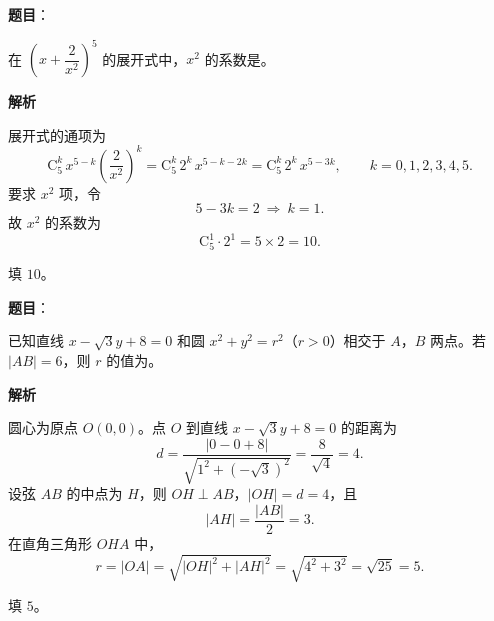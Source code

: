 \begin{answer}

\textbf{题目}：

在 $\left(x+\dfrac{2}{x^2}\right)^5$ 的展开式中，$x^2$ 的系数是\gkblank{}。

\textbf{解析}

展开式的通项为
\nopagebreak[4]
\[\mathrm C_5^k\,x^{5-k}\left(\frac{2}{x^2}\right)^k=\mathrm C_5^k\,2^k\,x^{5-k-2k}=\mathrm C_5^k\,2^k\,x^{5-3k},\qquad k=0,1,2,3,4,5 .\]
要求 $x^2$ 项，令
\nopagebreak[4]
\[5-3k=2\ \Longrightarrow\ k=1 .\]
故 $x^2$ 的系数为
\nopagebreak[4]
\[\mathrm C_5^1\cdot2^1=5\times2=10 .\]

填 $10$。


\end{answer}
\begin{answer}

\textbf{题目}：

已知直线 $x-\sqrt3y+8=0$ 和圆 $x^2+y^2=r^2$（$r>0$）相交于 $A$，$B$ 两点。若 $|AB|=6$，则 $r$ 的值为\gkblank{}。

\textbf{解析}

圆心为原点 $O(0,0)$。点 $O$ 到直线 $x-\sqrt3y+8=0$ 的距离为
\nopagebreak[4]
\[d=\frac{|0-0+8|}{\sqrt{1^2+(-\sqrt3)^2}}=\frac8{\sqrt4}=4 .\]
设弦 $AB$ 的中点为 $H$，则 $OH\perp AB$，$|OH|=d=4$，且
\nopagebreak[4]
\[|AH|=\frac{|AB|}2=3 .\]
在直角三角形 $OHA$ 中，
\nopagebreak[4]
\[r=|OA|=\sqrt{|OH|^2+|AH|^2}=\sqrt{4^2+3^2}=\sqrt{25}=5 .\]

填 $5$。


\end{answer}
